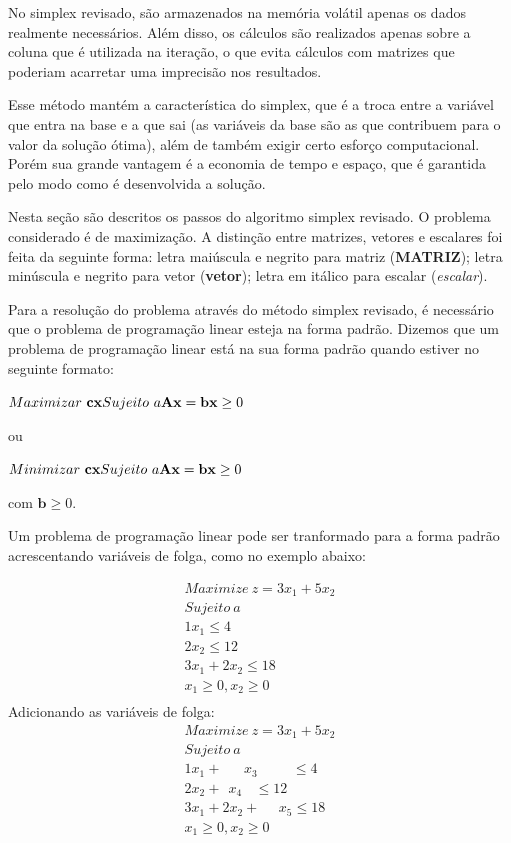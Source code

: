 No simplex revisado, são armazenados na memória volátil apenas os dados realmente necessários. Além disso, os cálculos são realizados apenas sobre a coluna que é utilizada na iteração, o que evita cálculos com matrizes que poderiam acarretar uma imprecisão nos resultados.

Esse método mantém a característica do simplex, que é a troca entre a variável que entra na base e a que sai (as variáveis da base são as que contribuem para o valor da solução ótima), além de também exigir certo esforço computacional. Porém sua grande vantagem é a economia de tempo e espaço, que é garantida pelo modo como é desenvolvida a solução. 

Nesta seção são descritos os passos do algoritmo simplex revisado. O problema considerado é de maximização. A distinção entre matrizes, vetores e escalares foi feita da seguinte forma: letra maiúscula e negrito para matriz (\textbf{MATRIZ}); letra minúscula e negrito para vetor (\textbf{vetor}); letra em itálico para escalar (\textit{escalar}).

Para a resolução do problema através do método simplex revisado, é necessário que o problema de programação linear esteja na forma padrão. Dizemos que um problema de programação linear está na sua forma padrão quando estiver no seguinte formato:

$\\
Maximizar\ \mathbf{cx} \\
Sujeito\ a \\
\mathbf{Ax} = \mathbf{b} \\
\mathbf{x} \geq0$

ou

$\\
Minimizar\ \mathbf{cx} \\
Sujeito\ a \\
\mathbf{Ax} = \mathbf{b} \\
\mathbf{x} \geq0$

com $\mathbf{b}\geq0$.

Um problema de programação linear pode ser tranformado para a forma padrão acrescentando variáveis de folga, como no exemplo abaixo:

\begin{align*}
Maximize\ z=3x_{1}+5x_{2}\\ 
Sujeito\ a \\ 
1x_{1}\leq 4 \\  
2x_{2}\leq 12 \\ 
3x_{1}+2x_{2}\leq 18 \\ 
 x_{1}\geq 0, x_{2}\geq 0 \\
\end{align*}
Adicionando as variáveis de folga:
\begin{align*}
Maximize\ z=3x_{1}+5x_{2}\\ 
Sujeito\ a\\
1x_{1}+\ \ \ \ \ \ \ x_{3}\ \ \ \ \ \ \ \ \ \ \ \leq 4 \\  
2x_{2}+\ \ x_{4}\ \ \ \ \leq 12 \\ 
3x_{1}+2x_{2}+\ \ \ \ \ \ x_{5}\leq 18 \\ 
 x_{1}\geq 0, x_{2}\geq 0 \\
\end{align*}

